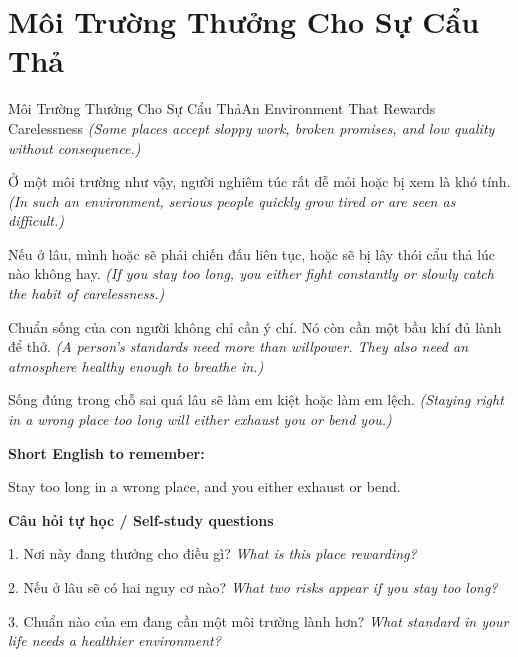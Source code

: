 \section{Môi Trường Thưởng Cho Sự Cẩu Thả}
\begin{truyen}{Môi Trường Thưởng Cho Sự Cẩu Thả}{An Environment That Rewards Carelessness}
\textit{(Some places accept sloppy work, broken promises, and low quality without consequence.)}

Ở một môi trường như vậy, người nghiêm túc rất dễ mỏi hoặc bị xem là khó tính.
\textit{(In such an environment, serious people quickly grow tired or are seen as difficult.)}

Nếu ở lâu, mình hoặc sẽ phải chiến đấu liên tục, hoặc sẽ bị lây thói cẩu thả lúc nào không hay.
\textit{(If you stay too long, you either fight constantly or slowly catch the habit of carelessness.)}

Chuẩn sống của con người không chỉ cần ý chí. Nó còn cần một bầu khí đủ lành để thở.
\textit{(A person's standards need more than willpower. They also need an atmosphere healthy enough to breathe in.)}

\end{truyen}

\begin{baihoc}
Sống đúng trong chỗ sai quá lâu sẽ làm em kiệt hoặc làm em lệch.
\textit{(Staying right in a wrong place too long will either exhaust you or bend you.)}
\end{baihoc}

\begin{ghinhoanh}
\textbf{Short English to remember:}

Stay too long in a wrong place, and you either exhaust or bend.

\end{ghinhoanh}

\begin{tuhocnhanh}
\textbf{Câu hỏi tự học / Self-study questions}

1. Nơi này đang thưởng cho điều gì? \textit{What is this place rewarding?}

2. Nếu ở lâu sẽ có hai nguy cơ nào? \textit{What two risks appear if you stay too long?}

3. Chuẩn nào của em đang cần một môi trường lành hơn? \textit{What standard in your life needs a healthier environment?}
\end{tuhocnhanh}
\ngancach

